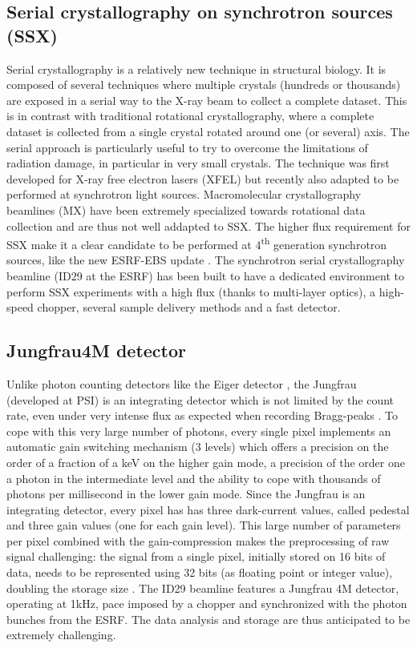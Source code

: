 \documentclass[preprint]{iucr}              %
\begin{document}
\subsection{Serial crystallography on synchrotron sources (SSX)}
Serial crystallography is a relatively new technique in structural biology. 
It is composed of several techniques where multiple crystals (hundreds or thousands) are exposed in a serial way to the X-ray beam to collect a complete dataset. 
This is in contrast with traditional rotational crystallography, where a complete dataset is collected from a single crystal rotated around one (or several) axis. 
The serial approach is particularly useful to try to overcome the limitations of radiation damage, in particular in very small crystals.
The technique was first developed for X-ray free electron lasers (XFEL) \cite{Chapman2011}
but recently also adapted to be performed at synchrotron light sources.
Macromolecular crystallography beamlines (MX) have been extremely specialized towards rotational data collection and are thus not well addapted to SSX.
The higher flux requirement for SSX make it a clear candidate to be performed at 4\textsuperscript{th} generation synchrotron sources, like the new ESRF-EBS update \cite{EBS}.
The synchrotron serial crystallography beamline (ID29 at the ESRF) has been built to have a dedicated environment to perform SSX experiments with a high flux (thanks to multi-layer optics), a high-speed chopper, several sample delivery methods and a fast detector.
\subsection{Jungfrau4M detector}
Unlike photon counting detectors like the Eiger detector \cite{Eiger}, the Jungfrau (developed at PSI) is an integrating detector which is not limited by the count rate, even under very intense flux as expected when recording Bragg-peaks \cite{jungfrau2016}.
To cope with this very large number of photons, every single pixel implements an automatic gain switching mechanism (3 levels) which offers a precision on the order of a fraction of a keV on the higher gain mode, a precision of the order one a photon in the intermediate level and the ability to cope with thousands of photons per millisecond in the lower gain mode.
Since the Jungfrau is an integrating detector, every pixel has has three dark-current values, called pedestal and three gain values (one for each gain level). 
This large number of parameters per pixel combined with the gain-compression makes the preprocessing of raw signal challenging: the signal from a single pixel, initially stored on 16 bits of data, needs to be represented using 32 bits (as floating point or integer value), doubling the storage size \cite{jungfrau_PSI}.
The ID29 beamline features a Jungfrau 4M detector, operating at 1kHz, pace imposed by a chopper and synchronized with the photon bunches from the ESRF.
The data analysis and storage are thus anticipated to be extremely challenging. 
\end{document}
